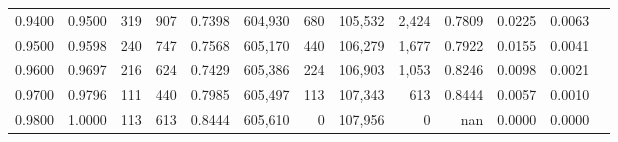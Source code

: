 \begin{tabular}{rrrrrrrrrrrrr}
0.9400 & 0.9500 &    319 &   907 &                                     0.7398 & 604,930 &     680 & 105,532 &   2,424 & 0.7809 & 0.0225 & 0.0063 \\
0.9500 & 0.9598 &    240 &   747 &                                     0.7568 & 605,170 &     440 & 106,279 &   1,677 & 0.7922 & 0.0155 & 0.0041 \\
0.9600 & 0.9697 &    216 &   624 &                                     0.7429 & 605,386 &     224 & 106,903 &   1,053 & 0.8246 & 0.0098 & 0.0021 \\
0.9700 & 0.9796 &    111 &   440 &                                     0.7985 & 605,497 &     113 & 107,343 &     613 & 0.8444 & 0.0057 & 0.0010 \\
0.9800 & 1.0000 &    113 &   613 &                                     0.8444 & 605,610 &       0 & 107,956 &       0 &    nan & 0.0000 & 0.0000 \\
\bottomrule
\end{tabular}
